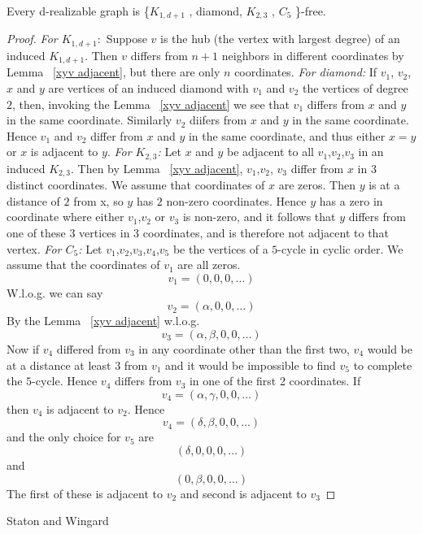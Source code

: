 \documentclass[12pt,a4paper,titlepage,openany]{report}
\begin{document}
\begin{theorem}\label{d-realizable-free}
Every d-realizable graph is \{$K_{1,d+1}$ , diamond,
$K_{2,3}$ , $C_5$ \}-free.
\end{theorem} 
\begin{proof}
\textit{For $K_{1,d+1}:$} Suppose $v$ is the hub (the vertex with largest degree) of an induced $K_{1,d+1}$. Then $v$ differs from $n+1$ neighbors in different coordinates by Lemma ~\ref{xyv adjacent}, but there are only $n$ coordinates.\newline
\textit{For diamond:} If $v_1$, $v_2$, $x$ and $y$ are vertices of an induced diamond with $v_1$ and $v_2$ the vertices of degree $2$, then, invoking the Lemma ~\ref{xyv adjacent} we see that $v_1$ differs from $x$ and $y$ in the same coordinate. Similarly $v_2$ diifers from $x$ and $y$ in the same coordinate. Hence $v_1$ and $v_2$ differ from $x$ and $y$ in the same coordinate, and thus either $x=y$ or $x$ is adjacent to $y$.\newline
\textit{For $K_{2,3}$:} Let $x$ and $y$ be adjacent to all $v_1$,$v_2$,$v_3$ in an induced $K_{2,3}$. Then by Lemma ~\ref{xyv adjacent}, $v_1$,$v_2$, $v_3$ differ from $x$ in $3$ distinct coordinates. We assume that coordinates of $x$ are zeros. Then $y$ is at a distance of $2$ from x, so $y$ has $2$ non-zero coordinates. Hence $y$ has a zero in coordinate where either $v_1$,$v_2$ or $v_3$ is non-zero, and it follows that $y$ differs from one of these $3$ vertices in $3$ coordinates, and is therefore not adjacent to that vertex.\newline
\textit{For $C_5$:} Let $v_1$,$v_2$,$v_3$,$v_4$,$v_5$ be the vertices of a $5$-cycle in cyclic order. We assume that the coordinates of $v_1$ are all zeros.
$$v_1=(0,0,0,\ldots)$$
W.l.o.g. we can say
$$v_2=(\alpha,0,0,\ldots)$$
By the Lemma ~\ref{xyv adjacent} w.l.o.g.
$$v_3=(\alpha,\beta,0,0,\ldots)$$
Now if $v_4$ differed from $v_3$ in any coordinate other than the first two, $v_4$ would be at a distance at least $3$ from $v_1$ and it would be impossible to find $v_5$ to complete the $5$-cycle. Hence $v_4$ differs from $v_3$ in one of the first 2 coordinates. If 
$$v_4=(\alpha,\gamma,0,0,\ldots)$$
then $v_4$ is adjacent to $v_2$. Hence
$$v_4=(\delta,\beta,0,0,\ldots)$$
and the only choice for $v_5$ are
$$(\delta,0,0,0,\ldots)$$
and 
$$(0,\beta,0,0,\ldots)$$
The first of these is adjacent to $v_2$ and second is adjacent to $v_3$
 
\end{proof}

Staton and Wingard
\end{document}
